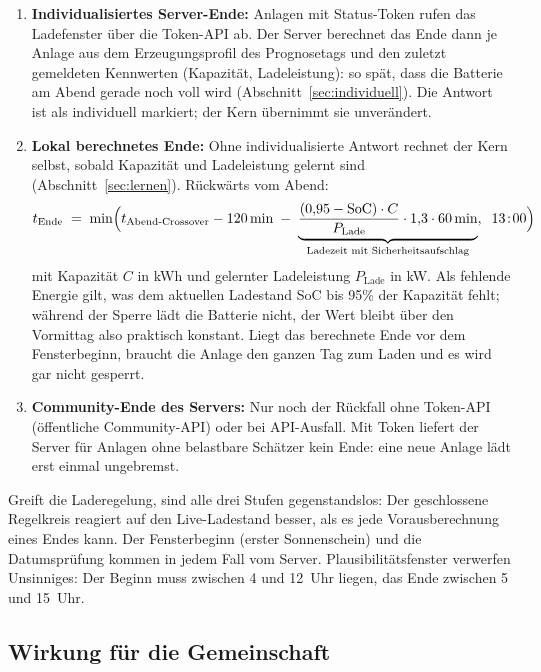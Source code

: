 \documentclass[11pt,a4paper]{article}
\begin{document}
\begin{enumerate}
  \item \textbf{Individualisiertes Server-Ende:} Anlagen mit Status-Token
    rufen das Ladefenster über die Token-API ab. Der Server berechnet das
    Ende dann je Anlage aus dem Erzeugungsprofil des Prognosetags und den
    zuletzt gemeldeten Kennwerten (Kapazität, Ladeleistung): so spät, dass
    die Batterie am Abend gerade noch voll wird
    (Abschnitt~\ref{sec:individuell}). Die Antwort ist als individuell
    markiert; der Kern übernimmt sie unverändert.
  \item \textbf{Lokal berechnetes Ende:} Ohne individualisierte Antwort
    rechnet der Kern selbst, sobald Kapazität und Ladeleistung gelernt sind
    (Abschnitt~\ref{sec:lernen}). Rückwärts vom Abend:
    \begin{equation}
      t_{\text{Ende}} \;=\; \min\Bigl(
        t_{\text{Abend-Crossover}} - 120\,\text{min}
        \;-\; \underbrace{\frac{(0{,}95 - \text{SoC}) \cdot C}{P_{\text{Lade}}} \cdot 1{,}3 \cdot 60\,\text{min}}_{\text{Ladezeit mit Sicherheitsaufschlag}},
        \;\; 13\!:\!00\Bigr)
      \label{eq:localend}
    \end{equation}
    mit Kapazität $C$ in kWh und gelernter Ladeleistung $P_{\text{Lade}}$
    in kW. Als fehlende Energie gilt, was dem aktuellen Ladestand SoC bis
    95\% der Kapazität fehlt; während der Sperre lädt die Batterie nicht,
    der Wert bleibt über den Vormittag also praktisch konstant. Liegt das
    berechnete Ende vor dem Fensterbeginn, braucht die Anlage den ganzen
    Tag zum Laden und es wird gar nicht gesperrt.
  \item \textbf{Community-Ende des Servers:} Nur noch der Rückfall ohne
    Token-API (öffentliche Community-API) oder bei API-Ausfall. Mit Token
    liefert der Server für Anlagen ohne belastbare Schätzer kein Ende:
    eine neue Anlage lädt erst einmal ungebremst.
\end{enumerate}

Greift die Laderegelung, sind alle drei Stufen gegenstandslos: Der
geschlossene Regelkreis reagiert auf den Live-Ladestand besser, als es jede
Vorausberechnung eines Endes kann. Der Fensterbeginn (erster Sonnenschein)
und die Datumsprüfung kommen in jedem Fall vom Server.
Plausibilitätsfenster verwerfen Unsinniges: Der Beginn muss zwischen 4 und
12~Uhr liegen, das Ende zwischen 5 und 15~Uhr.

\subsection{Wirkung für die Gemeinschaft}
\end{document}
